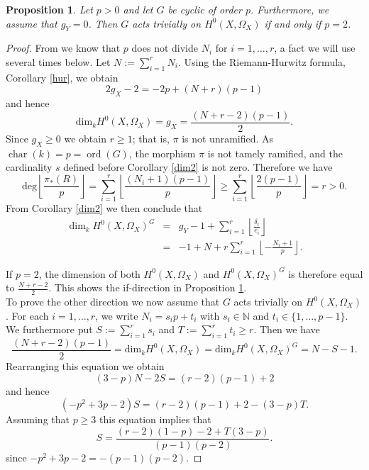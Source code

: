 \documentclass[draft, 11pt]{article} %
\theoremstyle{plain}
\newtheorem{prop}[defn]{Proposition}
\theoremstyle{remark}
\newcommand{\NN}{{\mathbb N}}
\DeclareMathOperator{\ord}{ord}
\DeclareMathOperator{\cha}{char}
\begin{document}
  \begin{prop}\label{m=1}
    Let $p  > 0$ and let $G$ be cyclic of order $p$.
    Furthermore, we assume that $g_Y=0$.
    Then $G$ acts trivially on $H^0(X,\Omega_X)$ if and only if $p=2$. 
  \end{prop}
  \begin{proof}
    From \cite[Lem 1, pg.87]{Naka} we know that $p$ does not divide $N_i$ for $i=1,\ldots ,r$, a fact we will use several times below. 
    Let $N:= \sum_{i=1}^r N_i$. 
    Using the Riemann-Hurwitz formula, Corollary \ref{hur}, we obtain
      \begin{equation}\label{hur2}
	2g_X - 2 = -2p + (N+r)(p-1)
      \end{equation}
    and hence
      \[
	\textrm{dim}_kH^0(X,\Omega_X) = g_X =\frac{(N+r-2)(p-1)}{2}.
      \] 
    Since $g_X \ge 0$ we obtain $r \ge 1$; that is, $\pi$ is not unramified. 
	As $\cha(k) = p = \ord(G)$, the morphism $\pi$ is not tamely ramified, and the cardinality $s$ defined before Corollary \ref{dim2} is not zero.
    Therefore we have 
      \[
	\textrm{deg} \left\lfloor \frac{\pi_*(R)}{p} \right\rfloor =
	\sum_{i=1}^r \left\lfloor \frac{(N_i+1)(p-1)}{p}\right\rfloor 
	\ge \sum_{i=1}^r \left\lfloor \frac{2(p-1)}{p}\right\rfloor = r > 0.
      \] 
	From Corollary \ref{dim2} we then conclude that 
	\begin{eqnarray*}
		\dim_kH^0\left(X,\Omega_X\right)^G & = & g_Y - 1 + \sum_{i=1}^r\left\lfloor \frac{\delta_i}{e_i}\right\rfloor \\
		& = & -1 + N + r \sum_{i=1}^r\left\lfloor -\frac{N_i+1}{p}\right\rfloor.
	\end{eqnarray*}

    If $p=2$, the dimension of both $H^0(X,\Omega_X)$ and $H^0(X,\Omega_X)^G$ is therefore equal to $\frac{N+r-2}{2}$. 
    This shows the if-direction in Proposition \ref{m=1}.\\
    To prove the other direction we now assume that $G$ acts trivially on $H^0(X, \Omega_X)$.
    For each $i=1, \ldots, r$, we write $N_i = s_i p +t_i$ with $s_i \in \NN$ and $t_i \in \{1, \ldots, p-1\}$. 
    We furthermore put $S:=\sum_{i=1}^r s_i$ and $T:= \sum_{i=1}^r t_i \ge r$. 
    Then we have
      \[ 
	 \frac{(N+r-2)(p-1)}{2} =\textrm{dim}_kH^0(X,\Omega_X)  = \textrm{dim}_k H^0(X,\Omega_X)^G = N-S-1 .
      \]
    Rearranging this equation we obtain
      \[
	 (3-p)N - 2S = (r-2)(p-1) +2  
      \]
    and hence
      \[
	 (-p^2 + 3p -2)S = (r-2)(p-1) +2 - (3-p)T.
      \]
    Assuming that $p \ge 3$ this equation implies that
      \[ 
	S = \frac{(r-2)(1-p)-2 + T (3-p)}{(p-1)(p-2)}. 
      \]
	since $-p^2+3p-2 = - (p-1)(p-2)$. 


\end{proof}
\end{document}
